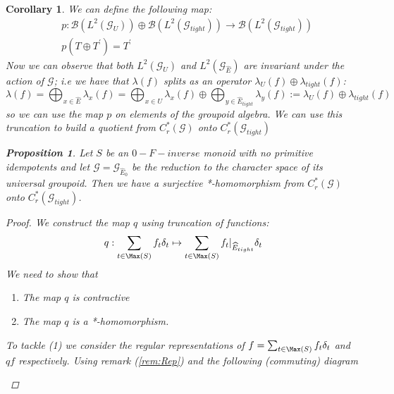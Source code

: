 \documentclass[11pt]{amsart}
\theoremstyle{plain}
\newtheorem{proposition}[theorem]{Proposition}%
\newtheorem{corollary}[theorem]{Corollary}%
\theoremstyle{definition}%
\theoremstyle{remark}%
\newcommand{\G}{\mathcal{G}}
\newcommand{\E}{\widehat{E}}
\begin{document}
\begin{corollary}
We can define the following map:
\begin{eqnarray*}\label{eqn:Quotent}
&p:\mathcal{B}(L^{2}(\G_{U})) \oplus\mathcal{B}( L^{2}(\G_{tight})) \rightarrow \mathcal{B}(L^{2}(\G_{tight}))\\
&p(T\oplus T^{'})=T^{'}
\end{eqnarray*}
Now we can observe that both $L^{2}(\G_{U})$ and $L^{2}(\G_{\E})$ are invariant under the action of $\G$; i.e we have that $\lambda(f)$ splits as an operator $\lambda_{U}(f)\oplus \lambda_{tight}(f)$:
\begin{equation*}
\lambda(f)=\bigoplus_{x \in \E}\lambda_{x}(f)=\bigoplus_{x \in U}\lambda_{x}(f) \oplus \bigoplus_{y \in \E_{tight}} \lambda_{y}(f) := \lambda_{U}(f)\oplus \lambda_{tight}(f)
\end{equation*}
so we can use the map $p$ on elements of the groupoid algebra.
We can use this truncation to build a quotient from $C^{*}_{r}(\G)$ onto $C^{*}_{r}(\G_{tight})$

\begin{proposition}\label{prop:P4}
Let $S$ be an $0-F-inverse$ monoid with no primitive idempotents and let $\G=\G_{\E_{0}}$ be the reduction to the character space of its universal groupoid. Then we have a surjective *-homomorphism from $C^{*}_{r}(\G)$ onto $C^{*}_{r}(\G_{tight})$.
\end{proposition}

\begin{proof}
We construct the map $q$ using truncation of functions:
\begin{equation*}
q: \sum_{t \in \Max(S)} f_{t} \delta_{t} \mapsto \sum_{t \in \Max(S)} f_{t}|_{\E_{tight}} \delta_{t} 
\end{equation*}
We need to show that
\begin{enumerate}
\item The map $q$ is contractive
\item The map $q$ is a *-homomorphism.
\end{enumerate}
To tackle (1) we consider the regular representations of $f = \sum_{t \in \Max(S)} f_{t} \delta_{t}$ and $qf$ respectively. Using remark (\ref{rem:Rep}) and the following (commuting) diagram

\begin{center}
\end{center}
\end{proof}
\end{corollary}
\end{document}

